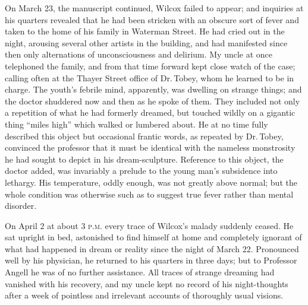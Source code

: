 \begin{pages}
\begin{Leftside}
On March 23, the manuscript continued, Wilcox failed to appear; and
inquiries at his quarters revealed that he had been stricken with an
obscure sort of fever and taken to the home of his family in Waterman
Street. He had cried out in the night, arousing several other artists in
the building, and had manifested since then only alternations of
unconsciousness and delirium. My uncle at once telephoned the family,
and from that time forward kept close watch of the case; calling often
at the Thayer Street office of Dr.\,Tobey, whom he learned to be in
charge. The youth's febrile mind, apparently, was dwelling on strange
things; and the doctor shuddered now and then as he spoke of them. They
included not only a repetition of what he had formerly dreamed, but
touched wildly on a gigantic thing ``miles high'' which walked or
lumbered about.
He at no time fully described this object but occasional frantic words,
as repeated by Dr.\,Tobey, convinced the professor that it must be
identical with the nameless monstrosity he had sought to depict in his
dream-sculpture. Reference to this object, the doctor added, was
invariably a prelude to the young man's subsidence into lethargy. His
temperature, oddly enough, was not greatly above normal; but the whole
condition was otherwise such as to suggest true fever rather than mental
disorder.

On April 2 at about 3 \textsc{p.m.} every trace of Wilcox's malady suddenly
ceased. He sat upright in bed, astonished to find himself at home and
completely ignorant of what had happened in dream or reality since the
night of March 22. Pronounced well by his physician, he returned to his
quarters in three days; but to Professor Angell he was of no further
assistance. All traces of strange dreaming had vanished with his
recovery, and my uncle kept no record of his night-thoughts after a week
of pointless and irrelevant accounts of thoroughly usual visions.


\end{Leftside}
\end{pages}
